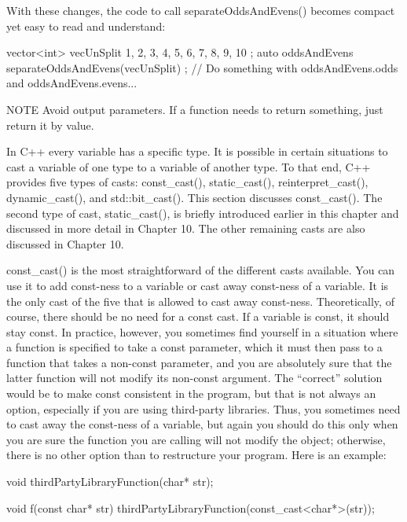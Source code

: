 With these changes, the code to call separateOddsAndEvens() becomes compact yet easy to read and understand:

\begin{cpp}
vector<int> vecUnSplit { 1, 2, 3, 4, 5, 6, 7, 8, 9, 10 };
auto oddsAndEvens { separateOddsAndEvens(vecUnSplit) };
// Do something with oddsAndEvens.odds and oddsAndEvens.evens...
\end{cpp}

\begin{myNotic}{NOTE}
Avoid output parameters. If a function needs to return something, just return it by value.
\end{myNotic}


In C++ every variable has a specific type. It is possible in certain situations to cast a variable of one type to a variable of another type. To that end, C++ provides five types of casts: const\_cast(), static\_cast(), reinterpret\_cast(), dynamic\_cast(), and std::bit\_cast(). This section discusses const\_cast(). The second type of cast, static\_cast(), is briefly introduced earlier in this chapter and discussed in more detail in Chapter 10. The other remaining casts are also discussed in Chapter 10.

const\_cast() is the most straightforward of the different casts available. You can use it to add const-ness to a variable or cast away const-ness of a variable. It is the only cast of the five that is allowed to cast away const-ness. Theoretically, of course, there should be no need for a const cast. If a variable is const, it should stay const. In practice, however, you sometimes find yourself in a situation where a function is specified to take a const parameter, which it must then pass to a function that takes a non-const parameter, and you are absolutely sure that the latter function will not modify its non-const argument. The “correct” solution would be to make const consistent in the program, but that is not always an option, especially if you are using third-party libraries. Thus, you sometimes need to cast away the const-ness of a variable, but again you should do this only when you are sure the function you are calling will not modify the object; otherwise, there is no other option than to restructure your program. Here is an example:

\begin{cpp}
void thirdPartyLibraryFunction(char* str);

void f(const char* str)
{
    thirdPartyLibraryFunction(const_cast<char*>(str));
}
\end{cpp}

